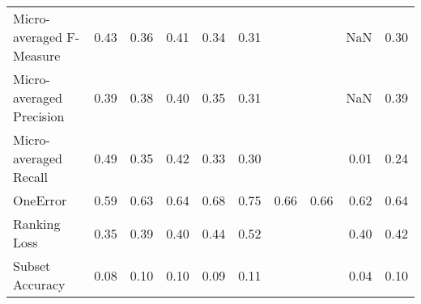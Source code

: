 \begin{tabular}{l|rrrrrrrrr}
Micro-averaged F-Measure & 0.43 & 0.36 & 0.41 & 0.34 & 0.31 &  &  & NaN & 0.30 \\

Micro-averaged Precision & 0.39 & 0.38 & 0.40 & 0.35 & 0.31 &  &  & NaN & 0.39 \\

Micro-averaged Recall & 0.49 & 0.35 & 0.42 & 0.33 & 0.30 &  &  & 0.01 & 0.24 \\

OneError & 0.59 & 0.63 & 0.64 & 0.68 & 0.75 & 0.66 & 0.66 & 0.62 & 0.64 \\

Ranking Loss & 0.35 & 0.39 & 0.40 & 0.44 & 0.52 &  &  & 0.40 & 0.42 \\

Subset Accuracy & 0.08 & 0.10 & 0.10 & 0.09 & 0.11 &  &  & 0.04 & 0.10 \\

\end{tabular}
